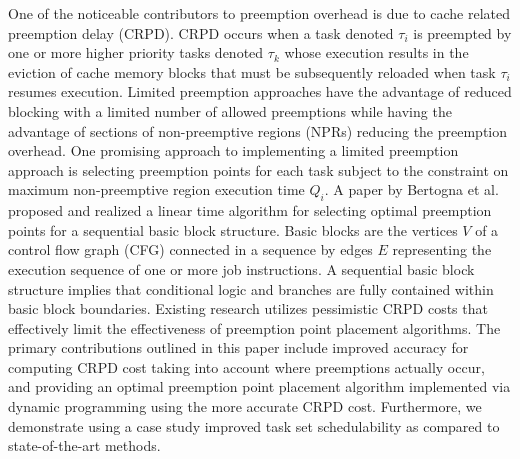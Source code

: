 One of the noticeable contributors to preemption overhead is due to cache related preemption delay (CRPD).  CRPD occurs when a task denoted \begin{math}\tau_{i}\end{math} is preempted by one or more higher priority tasks denoted \begin{math}\tau_{k}\end{math} whose execution results in the eviction of cache memory blocks that must be subsequently reloaded when task \begin{math}\tau_{i}\end{math} resumes execution.  Limited preemption approaches have the advantage of reduced blocking with a limited number of allowed preemptions while having the advantage of sections of non-preemptive regions (NPRs) reducing the preemption overhead.  One promising approach to implementing a limited preemption approach is selecting preemption points for each task subject to the constraint on maximum non-preemptive region execution time \begin{math}Q_{i}\end{math}.  A paper by Bertogna et al.~\cite{bertogna:11} proposed and realized a linear time algorithm for selecting optimal preemption points for a sequential basic block structure.  Basic blocks are the vertices $V$ of a control flow graph (CFG) connected in a sequence by edges $E$ representing the execution sequence of one or more job instructions.  A sequential basic block structure implies that conditional logic and branches are fully contained within basic block boundaries.
Existing research utilizes pessimistic CRPD costs that effectively limit the effectiveness of preemption point placement algorithms.
The primary contributions outlined in this paper include improved accuracy for computing CRPD cost taking into account where preemptions actually occur, and providing an optimal preemption point placement algorithm implemented via dynamic programming using the more accurate CRPD cost.  Furthermore, we demonstrate using a case study improved task set schedulability as compared to state-of-the-art methods.

